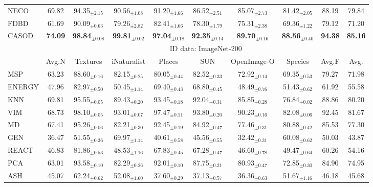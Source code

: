 \begin{table}[t!]
{\begin{tabular}{|l|c|cccccc|c|c|}
NECO   & 69.82 & 94.35$_{\pm 2.15}$ & 90.56$_{\pm 1.08}$ & 91.20$_{\pm 1.66}$ & 86.52$_{\pm 2.51}$ & 85.07$_{\pm 2.73}$ & 81.42$_{\pm 2.05}$ & 88.19 & 79.84 \\
FDBD   &  61.69 & 90.09$_{\pm 0.63}$ & 79.26$_{\pm 2.82}$ & 82.41$_{\pm 1.66}$ & 78.30$_{\pm 1.79}$ & 75.31$_{\pm 2.38}$ & 69.36$_{\pm 1.22}$ & 79.12 & 71.20 \\ \hline
CASOD  & \textbf{74.09} & \textbf{98.84}$_{\pm 0.08}$ & \textbf{99.81}$_{\pm 0.02}$ & \textbf{97.04}$_{\pm 0.18}$ & \textbf{92.35}$_{\pm 0.14}$ & \textbf{89.70}$_{\pm 0.16}$ & \textbf{88.56}$_{\pm 0.40}$ & \textbf{94.38} & \textbf{85.16} \\ \hline
			\multirow{2}{*}{} &  \multicolumn{9}{c|}{ID data: ImageNet-200}  \\ \cline{2-10}
			&  Avg.N & Textures  & iNaturalist  & Places  & SUN & OpenImage-O & Species & Avg.F & Avg. \\ \hline
            MSP    & 63.23 & 88.60$_{\pm 0.16}$ & 82.15$_{\pm 0.25}$ & 80.05$_{\pm 0.44}$ & 82.52$_{\pm 0.33}$ & 72.92$_{\pm 0.14}$ & 69.35$_{\pm 0.53}$ & 79.27 & 71.98 \\
ENERGY & 47.96 & 82.97$_{\pm 0.50}$ & 50.45$_{\pm 1.14}$ & 69.40$_{\pm 0.43}$ & 68.80$_{\pm 0.45}$ & 48.49$_{\pm 0.76}$ & 51.43$_{\pm 0.62}$ & 61.92 & 55.58 \\
KNN    & 69.81 & 95.55$_{\pm 0.05}$ & 89.43$_{\pm 0.20}$ & 93.45$_{\pm 0.18}$ & 92.04$_{\pm 0.31}$ & 85.85$_{\pm 0.28}$ & 76.84$_{\pm 0.02}$ & 88.86 & 80.20 \\
VIM    &  68.73 & 98.10$_{\pm 0.05}$ & 93.01$_{\pm 0.07}$ & 97.47$_{\pm 0.11}$ & 93.80$_{\pm 0.20}$ & 90.23$_{\pm 0.16}$ & 82.08$_{\pm 0.06}$ & 92.45 & 81.67 \\
MD     &  67.41 & 95.26$_{\pm 0.06}$ & 82.21$_{\pm 0.30}$ & 92.45$_{\pm 0.19}$ & 84.92$_{\pm 0.47}$ & 77.46$_{\pm 0.31}$ & 80.88$_{\pm 0.42}$ & 85.53 & 77.30 \\
GEN    & 36.47 & 51.55$_{\pm 0.36}$ & 69.97$_{\pm 1.14}$ & 40.61$_{\pm 0.58}$ & 45.56$_{\pm 0.55}$ & 32.42$_{\pm 0.31}$ & 60.08$_{\pm 0.62}$ & 50.03 & 43.87 \\
REACT  &  46.83 & 81.86$_{\pm 0.53}$ & 48.53$_{\pm 1.16}$ & 67.83$_{\pm 0.45}$ & 67.28$_{\pm 0.47}$ & 46.60$_{\pm 0.78}$ & 49.47$_{\pm 0.64}$ & 60.26 & 54.16 \\
PCA    &  63.01 & 93.58$_{\pm 0.10}$ & 82.29$_{\pm 0.26}$ & 92.01$_{\pm 0.10}$ & 87.75$_{\pm 0.21}$ & 80.93$_{\pm 0.47}$ & 72.85$_{\pm 0.30}$ & 84.90 & 74.95 \\
ASH    & 45.07 & 62.24$_{\pm 0.62}$ & 52.08$_{\pm 1.60}$ & 37.60$_{\pm 0.29}$ & 37.13$_{\pm 0.57}$ & 36.36$_{\pm 0.63}$ & 51.67$_{\pm 1.16}$ & 46.18 & 45.68 \\

\end{tabular}}
\end{table}
